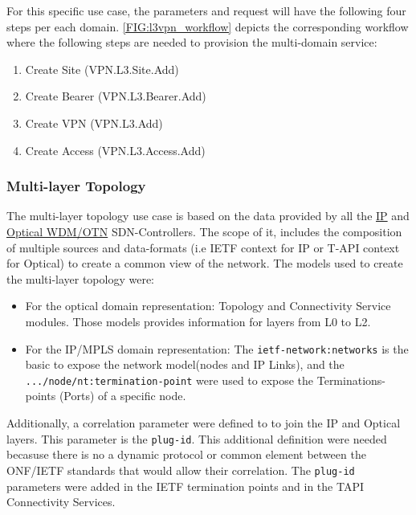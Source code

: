 \documentclass[a4paper,fleqn]{cas-dc}
\begin{document}
For this specific use case, the parameters and request will have the following four steps per each domain. \cref{FIG:l3vpn_workflow} depicts the corresponding workflow where the following steps are needed to provision the multi-domain service:
\begin{enumerate}
    \item Create Site (VPN.L3.Site.Add)
    \item Create Bearer (VPN.L3.Bearer.Add)
    \item Create VPN (VPN.L3.Add)
    \item Create Access (VPN.L3.Access.Add)
\end{enumerate}


\subsubsection{Multi-layer Topology}

The multi-layer topology use case is based on the data provided by all the \hyperref[subsection:IPtopo]{IP} and \hyperref[subsection:OPTopo]{Optical WDM/OTN} SDN-Controllers. The scope of it, includes the composition of multiple sources and data-formats (i.e IETF context for IP or T-API context for Optical) to create a common view of the network. The models used to create the multi-layer topology were:
\begin{itemize}
    \item For the optical domain representation: Topology and Connectivity Service modules. Those models provides information for layers from L0 to L2.
    \item For the IP/MPLS domain representation:  The \texttt{ietf-network:networks} is the basic to expose the network model(nodes and IP Links), and the \texttt{.../node/nt:termination-point}
    were used to expose the Terminations-points (Ports) of a specific node.
\end{itemize}
    
Additionally, a correlation parameter were defined to to join the IP and Optical layers. This parameter is the \texttt{plug-id}. This additional definition were needed becasuse there is no a dynamic protocol or common element between the ONF/IETF standards that would allow their correlation. The \texttt{plug-id} parameters were added in the IETF termination points and in the TAPI Connectivity Services. 
\end{document}
